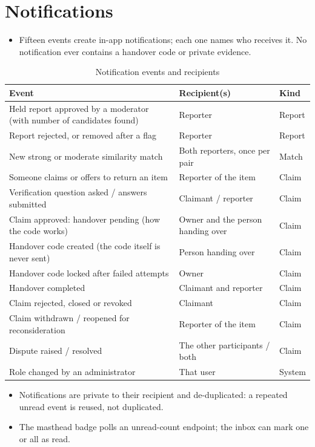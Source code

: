 \documentclass[12pt,a4paper,oneside]{report}
\begin{document}
\section{Notifications}
\begin{itemize}
  \item Fifteen events create in-app notifications; each one names who receives it. No notification ever contains a handover code or private evidence.
\end{itemize}
\begin{table}[H]
\centering\small
\caption{Notification events and recipients}
\begin{tabularx}{\textwidth}{X P{38mm} P{18mm}}
\toprule
Event & Recipient(s) & Kind\\
\midrule
Held report approved by a moderator (with number of candidates found) & Reporter & Report\\
Report rejected, or removed after a flag & Reporter & Report\\
New strong or moderate similarity match & Both reporters, once per pair & Match\\
Someone claims or offers to return an item & Reporter of the item & Claim\\
Verification question asked / answers submitted & Claimant / reporter & Claim\\
Claim approved: handover pending (how the code works) & Owner and the person handing over & Claim\\
Handover code created (the code itself is never sent) & Person handing over & Claim\\
Handover code locked after failed attempts & Owner & Claim\\
Handover completed & Claimant and reporter & Claim\\
Claim rejected, closed or revoked & Claimant & Claim\\
Claim withdrawn / reopened for reconsideration & Reporter of the item & Claim\\
Dispute raised / resolved & The other participants / both & Claim\\
Role changed by an administrator & That user & System\\
\bottomrule
\end{tabularx}
\end{table}
\begin{itemize}
  \item Notifications are private to their recipient and de-duplicated: a repeated unread event is reused, not duplicated.
  \item The masthead badge polls an unread-count endpoint; the inbox can mark one or all as read.
\end{itemize}
\end{document}
